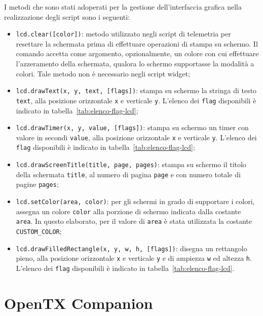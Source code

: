 \documentclass[a4paper, 12pt]{report} %
\begin{document}
I metodi che sono stati adoperati per la gestione dell'interfaccia grafica nella realizzazione degli script sono i seguenti:
\begin{itemize}
        \item \texttt{lcd.clear([color])}: metodo utilizzato negli script di telemetria per resettare la schermata prima di effettuare operazioni di stampa su schermo. Il comando accetta come argomento, opzionalmente, un colore con cui effettuare l'azzeramento della schermata, qualora lo schermo supportasse la modalità a colori. Tale metodo non è necessario negli script widget;
        \item \texttt{lcd.drawText(x, y, text, [flags])}: stampa su schermo la stringa di testo \texttt{text}, alla posizione orizzontale \texttt{x} e verticale \texttt{y}. L'elenco dei \texttt{flag} disponibili è indicato in tabella~\ref{tab:elenco-flag-lcd};
        \item \texttt{lcd.drawTimer(x, y, value, [flags])}: stampa su schermo un timer con valore in secondi \texttt{value}, alla posizione orizzontale \texttt{x} e verticale \texttt{y}. L'elenco dei \texttt{flag} disponibili è indicato in tabella~\ref{tab:elenco-flag-lcd};
        \item \texttt{lcd.drawScreenTitle(title, page, pages)}: stampa su schermo il titolo della schermata \texttt{title}, al numero di pagina \texttt{page} e con numero totale di pagine \texttt{pages};
        \item \texttt{lcd.setColor(area, color)}: per gli schermi in grado di supportare i colori, assegna un colore \texttt{color} alla porzione di schermo indicata dalla costante \texttt{area}. In questo elaborato, per il valore di \texttt{area} è stata utilizzata la costante \texttt{CUSTOM\_COLOR};
        \item \texttt{lcd.drawFilledRectangle(x, y, w, h, [flags])}: disegna un rettangolo pieno, alla posizione orizzontale \texttt{x} e verticale \texttt{y} e di ampiezza \texttt{w} ed altezza \texttt{h}. L'elenco dei \texttt{flag} disponibili è indicato in tabella~\ref{tab:elenco-flag-lcd}.
\end{itemize}










\section{OpenTX Companion}
\end{document}
